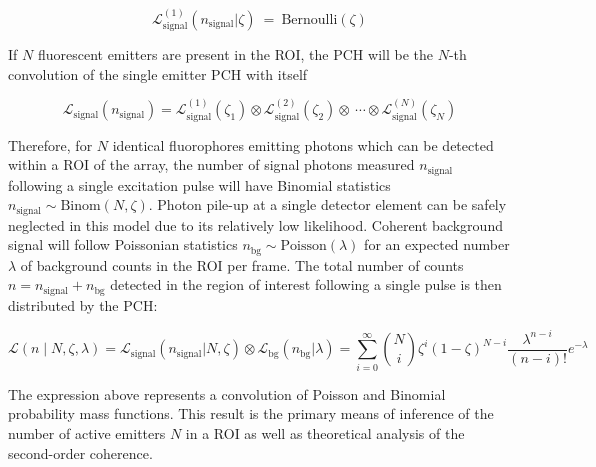 \begin{equation}
\mathcal{L}_{\mathrm{signal}}^{(1)}(n_{\mathrm{signal}}\lvert\zeta)\ =\ \mathrm{Bernoulli}(\zeta)
\end{equation}

If $N$ fluorescent emitters are present in the ROI, the PCH will be the $N$-th convolution of the single emitter PCH with itself \parencite{Chen1999}

\begin{equation}
\mathcal{L}_{\mathrm{signal}}(n_{\mathrm{signal}})=\mathcal{L}_{\mathrm{signal}}^{(1)}(\zeta_1)\otimes\mathcal{L}_{\mathrm{signal}}^{(2)}(\zeta_2)\otimes\ \cdots\otimes\mathcal{L}_{\mathrm{signal}}^{(N)}(\zeta_N)
\end{equation}

Therefore, for $N$ identical fluorophores emitting photons which can be detected within a ROI of the array, the number of signal photons measured $n_{\mathrm{signal}}$ following a single excitation pulse will have Binomial statistics $n_{\mathrm{signal}}\sim \mathrm{Binom}\left(N,\zeta\right)$. Photon pile-up at a single detector element can be safely neglected in this model due to its relatively low likelihood. Coherent background signal will follow Poissonian statistics $n_{\mathrm{bg}}\sim\mathrm{Poisson}\left(\lambda\right)$ for an expected number $\lambda$ of background counts in the ROI per frame. The total number of counts $n=n_{\mathrm{signal}}+n_{\mathrm{bg}}$ detected in the region of interest following a single pulse is then distributed by the PCH:

\begin{equation}
\mathcal{L}\left(n\mid N,\zeta,\lambda\right)=\mathcal{L}_{\mathrm{signal}}(n_{\mathrm{signal}}\lvert N,\zeta)\otimes\mathcal{L}_{\mathrm{bg}}(n_{\mathrm{bg}}\lvert \lambda)=\sum_{i=0}^{\infty}\binom{N}{i}\zeta^i\left(1-\zeta\right)^{N-i}\frac{\lambda^{n-i}}{\left(n-i\right)!}e^{-\lambda} 
\end{equation}

The expression above represents a convolution of Poisson and Binomial probability mass functions. This result is the primary means of inference of the number of active emitters $N$ in a ROI as well as theoretical analysis of the second-order coherence. 





